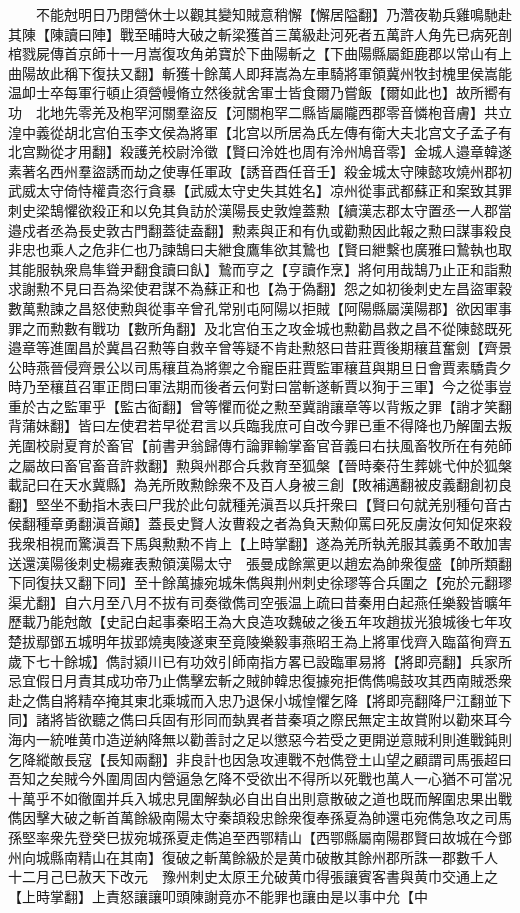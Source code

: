 　　不能尅明日乃閉營休士以觀其變知賊意稍懈【懈居隘翻】乃濳夜勒兵雞鳴馳赴其陳【陳讀曰陣】戰至晡時大破之斬梁獲首三萬級赴河死者五萬許人角先已病死剖棺戮屍傳首京師十一月嵩復攻角弟寶於下曲陽斬之【下曲陽縣屬鉅鹿郡以常山有上曲陽故此稱下復扶又翻】斬獲十餘萬人即拜嵩為左車騎將軍領冀州牧封槐里侯嵩能温卹士卒每軍行頓止須營幔脩立然後就舍軍士皆食爾乃嘗飯【爾如此也】故所嚮有功　北地先零羌及枹罕河關羣盜反【河關枹罕二縣皆屬隴西郡零音憐枹音膚】共立湟中義從胡北宫伯玉李文侯為將軍【北宫以所居為氏左傳有衛大夫北宫文子孟子有北宫黝從才用翻】殺護羌校尉泠徵【賢曰泠姓也周有泠州鳩音零】金城人邉章韓遂素著名西州羣盜誘而劫之使專任軍政【誘音酉任音壬】殺金城太守陳懿攻燒州郡初武威太守倚恃權貴恣行貪暴【武威太守史失其姓名】凉州從事武都蘇正和案致其罪刺史梁鵠懼欲殺正和以免其負訪於漢陽長史敦煌蓋勲【續漢志郡太守置丞一人郡當邉戍者丞為長史敦古門翻蓋徒盍翻】勲素與正和有仇或勸勲因此報之勲曰謀事殺良非忠也乘人之危非仁也乃諫鵠曰夫紲食鷹隼欲其鷙也【賢曰紲繫也廣雅曰鷙執也取其能服執衆鳥隼聳尹翻食讀曰飤】鷙而亨之【亨讀作烹】將何用哉鵠乃止正和詣勲求謝勲不見曰吾為梁使君謀不為蘇正和也【為于偽翻】怨之如初後刺史左昌盜軍穀數萬勲諫之昌怒使勲與從事辛曾孔常别屯阿陽以拒賊【阿陽縣屬漢陽郡】欲因軍事罪之而勲數有戰功【數所角翻】及北宫伯玉之攻金城也勲勸昌救之昌不從陳懿既死邉章等進圍昌於冀昌召勲等自救辛曾等疑不肯赴勲怒曰昔莊賈後期穰苴奮劍【齊景公時燕晉侵齊景公以司馬穰苴為將禦之令寵臣莊賈監軍穰苴與期旦日會賈素驕貴夕時乃至穰苴召軍正問曰軍法期而後者云何對曰當斬遂斬賈以狥于三軍】今之從事豈重於古之監軍乎【監古䘖翻】曾等懼而從之勲至冀誚讓章等以背叛之罪【誚才笑翻背蒲妹翻】皆曰左使君若早從君言以兵臨我庶可自改今罪已重不得降也乃解圍去叛羌圍校尉夏育於畜官【前書尹翁歸傳冇論罪輸掌畜官音義曰右扶風畜牧所在有苑師之屬故曰畜官畜音許救翻】勲與州郡合兵救育至狐槃【晉時秦苻生葬姚弋仲於狐槃載記曰在天水冀縣】為羌所敗勲餘衆不及百人身被三創【敗補邁翻被皮義翻創初良翻】堅坐不動指木表曰尸我於此句就種羌滇吾以兵扞衆曰【賢曰句就羌别種句音古侯翻種章勇翻滇音顚】蓋長史賢人汝曹殺之者為負天勲仰罵曰死反虜汝何知促來殺我衆相視而驚滇吾下馬與勲勲不肯上【上時掌翻】遂為羌所執羌服其義勇不敢加害送還漢陽後刺史楊雍表勲領漢陽太守　張曼成餘黨更以趙宏為帥衆復盛【帥所類翻下同復扶又翻下同】至十餘萬據宛城朱儁與荆州刺史徐璆等合兵圍之【宛於元翻璆渠尤翻】自六月至八月不拔有司奏徵儁司空張温上疏曰昔秦用白起燕任樂毅皆曠年歷載乃能尅敵【史記白起事秦昭王為大良造攻魏破之後五年攻趙拔光狼城後七年攻楚拔鄢鄧五城明年拔郢燒夷陵遂東至竟陵樂毅事燕昭王為上將軍伐齊入臨菑徇齊五歲下七十餘城】儁討潁川已有功效引師南指方畧已設臨軍易將【將即亮翻】兵家所忌宜假日月責其成功帝乃止儁擊宏斬之賊帥韓忠復據宛拒儁儁鳴鼓攻其西南賊悉衆赴之儁自將精卒掩其東北乘城而入忠乃退保小城惶懼乞降【將即亮翻降尸江翻並下同】諸將皆欲聽之儁曰兵固有形同而埶異者昔秦項之際民無定主故賞附以勸來耳今海内一統唯黄巾造逆納降無以勸善討之足以懲惡今若受之更開逆意賊利則進戰鈍則乞降縱敵長寇【長知兩翻】非良計也因急攻連戰不尅儁登土山望之顧謂司馬張超曰吾知之矣賊今外圍周固内營逼急乞降不受欲出不得所以死戰也萬人一心猶不可當况十萬乎不如徹圍并兵入城忠見圍解埶必自出自出則意散破之道也既而解圍忠果出戰儁因擊大破之斬首萬餘級南陽太守秦頡殺忠餘衆復奉孫夏為帥還屯宛儁急攻之司馬孫堅率衆先登癸巳拔宛城孫夏走儁追至西鄂精山【西鄂縣屬南陽郡賢曰故城在今鄧州向城縣南精山在其南】復破之斬萬餘級於是黄巾破散其餘州郡所誅一郡數千人　十二月己巳赦天下改元　豫州刺史太原王允破黄巾得張讓賓客書與黄巾交通上之【上時掌翻】上責怒讓讓叩頭陳謝竟亦不能罪也讓由是以事中允【中